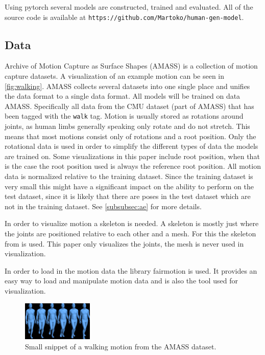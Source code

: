 Using pytorch \cite{pytorch} several models are constructed, trained and evaluated. All of the source code is available at \texttt{https://github.com/Martoko/human-gen-model}.

\subsection{Data}\label{subsec:data}
Archive of Motion Capture as Surface Shapes (AMASS) \cite{AMASS:2019} is a collection of motion capture datasets. A visualization of an example motion can be seen in \autoref{fig:walking}. AMASS collects several datasets into one single place and unifies the data format to a single data format. All models will be trained on data AMASS. Specifically all data from the CMU \cite{cmuWEB} dataset (part of AMASS) that has been tagged with the \texttt{walk} tag. Motion is usually stored as rotations around joints, as human limbs generally speaking only rotate and do not stretch. This means that most motions consist only of rotations and a root position. Only the rotational data is used in order to simplify the different types of data the models are trained on. Some visualizations in this paper include root position, when that is the case the root position used is always the reference root position. All motion data is normalized relative to the training dataset. Since the training dataset is very small this might have a significant impact on the ability to perform on the test dataset, since it is likely that there are poses in the test dataset which are not in the training dataset. See \ref{subsubsec:ae} for more details.

In order to visualize motion a skeleton is needed. A skeleton is mostly just where the joints are positioned relative to each other and a mesh. For this the skeleton from \cite{MANO} is used. This paper only visualizes the joints, the mesh is never used in visualization.

In order to load in the motion data the library fairmotion \cite{gopinath2020fairmotion} is used. It provides an easy way to load and manipulate motion data and is also the tool used for visualization.


\begin{figure}[h]
\centering
\includegraphics[width=0.3\textwidth]{img/02_01}
\caption{Small snippet of a walking motion from the AMASS dataset.}
\label{fig:walking}
\end{figure}




